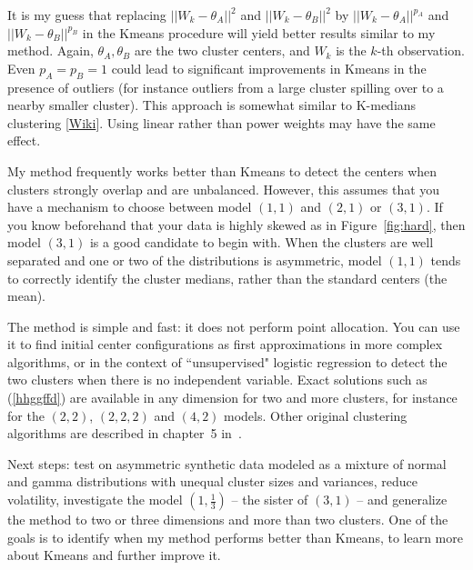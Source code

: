 \documentclass[oneside,10pt]{book}
\begin{document}
It is my guess that replacing $||W_k-\theta_A||^2$ and $||W_k-\theta_B||^2$ 
by $||W_k-\theta_A||^{p_A}$ and $||W_k-\theta_B||^{p_B}$ 
 in the Kmeans procedure will yield better results similar to my method. Again, $\theta_A, \theta_B$ are the two cluster centers, and $W_k$ is 
 the $k$-th observation. Even $p_A=p_B=1$ could lead to significant improvements in Kmeans in the presence of outliers (for instance outliers from
 a large cluster spilling over to a nearby smaller cluster). 
This approach is somewhat similar to \textcolor{index}{K-medians clustering} [\href{https://en.wikipedia.org/wiki/K-medians_clustering}{Wiki}]. Using linear rather than power weights may have the same effect. \vspace{1ex}


\noindent My method frequently works better than Kmeans to detect the centers when clusters strongly overlap and are unbalanced. However, this assumes that you have a 
mechanism to choose between model $(1, 1)$ and $(2, 1)$ or $(3, 1)$.  If you know beforehand that your data is highly skewed as in
 Figure~\ref{fig:hard}, then model $(3, 1)$ is a good candidate to begin with. When the clusters are well separated and one or two of the distributions is asymmetric,
 model $(1, 1)$ tends to correctly identify the cluster medians, rather than the standard centers (the mean). 

The method is simple and fast:  it does not perform point allocation. You can use it to find initial center configurations as first
 approximations in more complex algorithms, or in the context of ``unsupervised" 
\textcolor{index}{logistic regression} to detect the two clusters when there is no independent variable.  Exact solutions such as (\ref{hhggffd}) are available in any dimension for two and more clusters, for instance for the $(2, 2)$, $(2,2,2)$ and $(4, 2)$ models. Other original clustering algorithms are described in 
 chapter~5 in~\cite{vgelsevier}. 

Next steps: test on asymmetric synthetic data modeled as a mixture of normal and gamma distributions with unequal cluster sizes and variances, reduce volatility, investigate the model $(1, \frac{1}{3})$ -- the sister of $(3, 1)$ -- and generalize the method to two or three dimensions and more than two clusters. One of the goals is to identify when my method performs better than Kmeans, to learn more about Kmeans and further improve it. 
\end{document}
